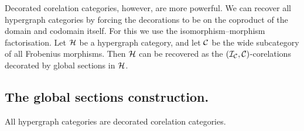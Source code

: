 Decorated corelation categories, however, are more powerful. We can recover all
hypergraph categories by forcing the decorations to be on the coproduct of the
domain and codomain itself. For this we use the isomorphism--morphism
factorisation. Let $\mathcal H$ be a hypergraph category, and let $\mathcal C$ be the wide
subcategory of all Frobenius morphisms. Then $\mathcal H$ can be recovered as the
$(\mathcal I_{\mathcal C},\mathcal C)$-corelations decorated by global sections in $\mathcal H$.

\subsection{The global sections construction.}

\begin{theorem}
  All hypergraph categories are decorated corelation categories.
\end{theorem}
